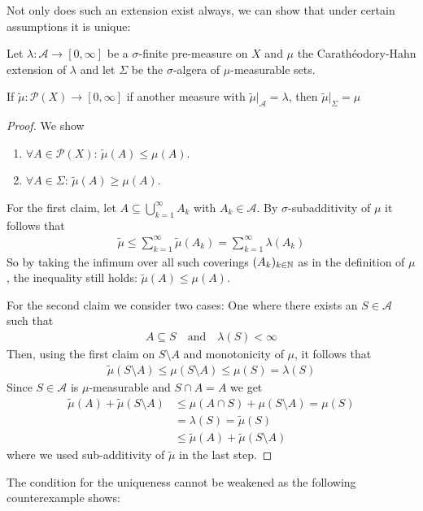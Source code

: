 Not only does such an extension exist always, we can show that under certain assumptions it is unique:
\begin{thm}
  Let $\lambda: \mathcal{A} \to  [0,\infty]$ be a $\sigma$-finite pre-measure on $X$ and $\mu$ the Carathéodory-Hahn extension of $\lambda$ and let $\Sigma$ be the $\sigma$-algera of $\mu$-measurable sets.

  If $\tilde{\mu}: \mathcal{P}(X) \to [0,\infty]$ if another measure with $\tilde{\mu}|_{\mathcal{A}} = \lambda$, then $\tilde{\mu}|_{\Sigma} = \mu$
\end{thm}
\begin{proof}
  We show
  \begin{enumerate}
    \item $\forall A \in \mathcal{P}(X)$: $\tilde{\mu}(A) \leq \mu(A)$.
    \item $\forall A \in \Sigma$: $\tilde{\mu}(A) \geq \mu(A)$.
  \end{enumerate}
  For the first claim, let $A \subseteq \bigcup_{k=1}^{\infty}A_k$ with $A_k \in \mathcal{A}$.
  By $\sigma$-subadditivity of $\mu$ it follows that
\begin{align*}
  \tilde{\mu} \leq \sum_{k=1}^{\infty}\tilde{\mu}(A_k) = \sum_{k=1}^{\infty}\lambda(A_k)
\end{align*}
So by taking the infimum over all such coverings $(A_k)_{k \in \mathbb{N}}$ as in the definition of $\mu$, the inequality still holds: $\tilde{\mu}(A) \leq \mu(A)$.

  For the second claim we consider two cases: One where there exists an $S \in \mathcal{A}$ such that
  \begin{align*}
    A \subseteq S \quad \text{and} \quad \lambda(S) < \infty
  \end{align*}
  Then, using the first claim on $S \setminus A$ and monotonicity of $\mu$, it follows that
  \begin{align*}
    \tilde{\mu}(S \setminus A) \leq \mu(S \setminus A) \leq \mu(S) = \lambda(S)
  \end{align*}
    Since $S \in \mathcal{A}$ is $\mu$-measurable and $S \cap A = A$ we get
  \begin{align*}
    \tilde{\mu}(A) + \tilde{\mu}(S \setminus A) 
    &\leq
    \mu(A \cap S) + \mu(S \setminus A) = \mu(S)\\
    &=
    \lambda(S) = \tilde{\mu}(S)\\
    &\leq 
    \tilde{\mu}(A) + \tilde{\mu}(S \setminus A)
  \end{align*}
  where we used sub-additivity of $\tilde{\mu}$ in the last step.
\end{proof}


The condition for the uniqueness cannot be weakened as the following counterexample shows:
